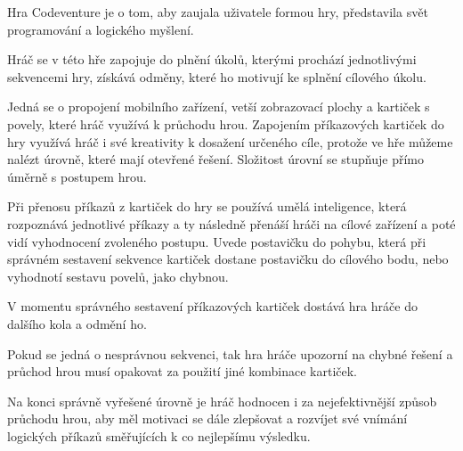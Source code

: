 
Hra Codeventure je o tom, aby zaujala uživatele formou hry, představila svět programování a logického myšlení.\par Hráč se v této hře zapojuje do plnění úkolů, kterými prochází jednotlivými sekvencemi hry, získává odměny, které ho motivují ke splnění cílového úkolu.\par Jedná se o propojení mobilního zařízení, vetší zobrazovací plochy a kartiček s povely, které hráč využívá k průchodu hrou. Zapojením příkazových kartiček do hry využívá hráč i své kreativity k dosažení určeného cíle, protože ve hře můžeme nalézt úrovně, které mají otevřené řešení. Složitost úrovní se stupňuje přímo úměrně s postupem hrou.\par Při přenosu příkazů z kartiček do hry se používá umělá inteligence, která rozpoznává jednotlivé příkazy a ty následně přenáší hráči na cílové zařízení a poté vidí vyhodnocení zvoleného postupu. Uvede postavičku do pohybu, která při správném sestavení sekvence kartiček dostane postavičku do cílového bodu, nebo vyhodnotí sestavu povelů, jako chybnou.\par V momentu správného sestavení příkazových kartiček dostává hra hráče do dalšího kola a odmění ho.\par Pokud se jedná o nesprávnou sekvenci, tak hra hráče upozorní na chybné řešení a průchod hrou musí opakovat za použití jiné kombinace kartiček.\par Na konci správně vyřešené úrovně je hráč hodnocen i za nejefektivnější způsob průchodu hrou, aby měl motivaci se dále zlepšovat a rozvíjet své vnímání logických příkazů směřujících k co nejlepšímu výsledku.